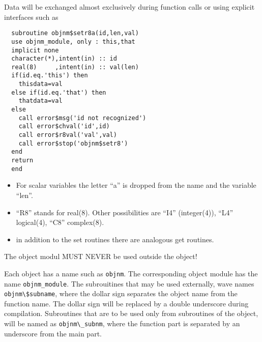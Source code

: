 \documentclass[11pt,a4paper]{report}
\begin{document}
Data will be exchanged almost exclusively during function calls or
 using explicit interfaces such as
\begin{verbatim}
  subroutine objnm$setr8a(id,len,val)
  use objnm_module, only : this,that
  implicit none
  character(*),intent(in) :: id
  real(8)     ,intent(in) :: val(len)
  if(id.eq.'this') then
    thisdata=val
  else if(id.eq.'that') then
    thatdata=val
  else
    call error$msg('id not recognized')
    call error$chval('id',id)
    call error$r8val('val',val)
    call error$stop('objnm$setr8')
  end
  return
  end
\end{verbatim}
\begin{itemize}
\item For scalar variables the letter ``a'' is dropped from the name and the
variable ``len''. 
%
\item ``R8'' stands for real(8). Other possibilities are ``I4''
  (integer(4)), ``L4'' logical(4), ``C8'' complex(8).
%
\item in addition to the set routines there are analogous get routines.
\end{itemize}

The object modul MUST NEVER be used outside the object!

Each object has a name such as \verb|objnm|. The corresponding object module
has the name \verb|objnm_module|. The subrouitines that may be used
externally, wave names \verb|objnm\$subname|, where the dollar sign
separates the object name from the function name. The dollar sign will
be replaced by a double underscore during compilation. Subroutines
that are to be used only from subroutines of the object, will be named
as \verb|objnm\_subnm|, where the function part is separated by an
underscore from the main part.






\clearpage


\end{document}
